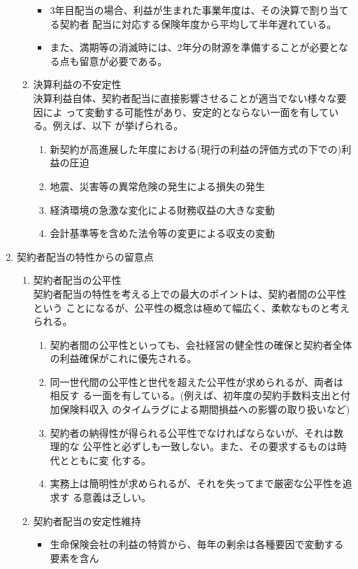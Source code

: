 \documentclass[report,gutter=10mm,fore-edge=10mm,uplatex,dvipdfmx]{jlreq}
\begin{document}
\begin{enumerate}
\begin{enumerate}
\begin{itemize}
 \item 3年目配当の場合、利益が生まれた事業年度は、その決算で割り当てる契約者
配当に対応する保険年度から平均して半年遅れている。
 \item また、満期等の消滅時には、2年分の財源を準備することが必要となる点も留意が必要である。
\end{itemize}
 \item 決算利益の不安定性\\
決算利益自体、契約者配当に直接影響させることが適当でない様々な要因によ
って変動する可能性があり、安定的とならない一面を有している。例えば、以下
が挙げられる。
\begin{enumerate}
 \item 新契約が高進展した年度における(現行の利益の評価方式の下での)利益の圧迫
 \item 地震、災害等の異常危険の発生による損失の発生
 \item 経済環境の急激な変化による財務収益の大きな変動
 \item 会計基準等を含めた法令等の変更による収支の変動
\end{enumerate}
\end{enumerate}
 \item 契約者配当の特性からの留意点
\begin{enumerate}
 \item 契約者配当の公平性\\
契約者配当の特性を考える上での最大のポイントは、契約者間の公平性という
ことになるが、公平性の概念は極めて幅広く、柔軟なものと考えられる。
\begin{enumerate}
 \item 契約者間の公平性といっても、会社経営の健全性の確保と契約者全体の利益確保がこれに優先される。
 \item 同一世代間の公平性と世代を超えた公平性が求められるが、両者は相反す
る一面を有している。(例えば、初年度の契約手数料支出と付加保険料収入
のタイムラグによる期間損益への影響の取り扱いなど)
 \item 契約者の納得性が得られる公平性でなければならないが、それは数理的な
公平性と必ずしも一致しない。また、その要求するものは時代とともに変
化する。
 \item 実務上は簡明性が求められるが、それを失ってまで厳密な公平性を追求す
る意義は乏しい。
\end{enumerate}
 \item 契約者配当の安定性維持
\begin{itemize}
 \item 生命保険会社の利益の特質から、毎年の剰余は各種要因で変動する要素を含ん

\end{itemize}
\end{enumerate}
\end{enumerate}
\end{document}
